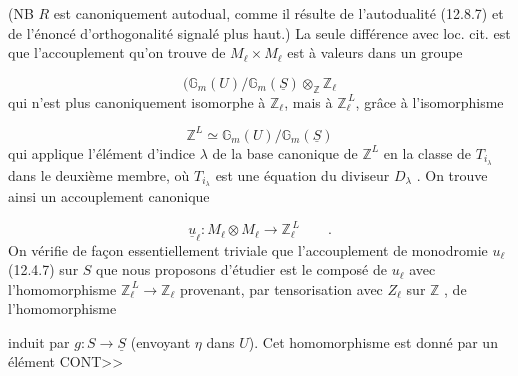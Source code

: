 
(NB $R$ est canoniquement autodual, comme il résulte de l'autodualité (12.8.7) et de l'énoncé d'orthogonalité signalé plus haut.) La seule différence avec loc. cit. est que l'accouplement qu'on trouve de $M_\ell \times M_\ell$ est à valeurs dans un groupe

\begin{equation*}
(\mathbb{G}_m(U)/\mathbb{G}_m(\underline{S}) \otimes_{\mathbb{Z}} \mathbb{Z}_\ell
\end{equation*}
qui n'est plus canoniquement isomorphe à $\mathbb{Z}_\ell$, mais à $\mathbb{Z}_\ell^{\,L}$, grâce à l'isomorphisme

\begin{equation}\tag{12.8.10}
\mathbb{Z}^L \simeq \mathbb{G}_m(U)/\mathbb{G}_m(\underline{S})
\end{equation}
qui applique l'élément d'indice $\lambda$ de la base canonique de $\mathbb{Z}^L$ en la classe de $T_{i_\lambda}$ dans le deuxième membre, où $T_{i_\lambda}$ est une équation du diviseur $D_\lambda$ . On trouve ainsi un accouplement canonique

\begin{equation}\tag{12.8.11}
\underline{u}_\ell : M_\ell \otimes M_\ell \longrightarrow \mathbb{Z}_\ell^{\,L} \qquad .
\end{equation}
On vérifie de façon essentiellement triviale que l'accouplement de monodromie $u_\ell$ (12.4.7) sur $S$ que nous proposons d'étudier est le composé de $u_\ell$ avec l'homomorphisme $\mathbb{Z}_\ell^{\,L} \longrightarrow \mathbb{Z}_\ell$ provenant, par tensorisation avec $Z_\ell$ sur $\mathbb{Z}$ , de l'homomorphisme

\begin{center}
\end{center}
induit par $g : S \longrightarrow \underline{S}$ (envoyant $\eta$ dans $U$). Cet homomorphisme est donné par un élément CONT>>


